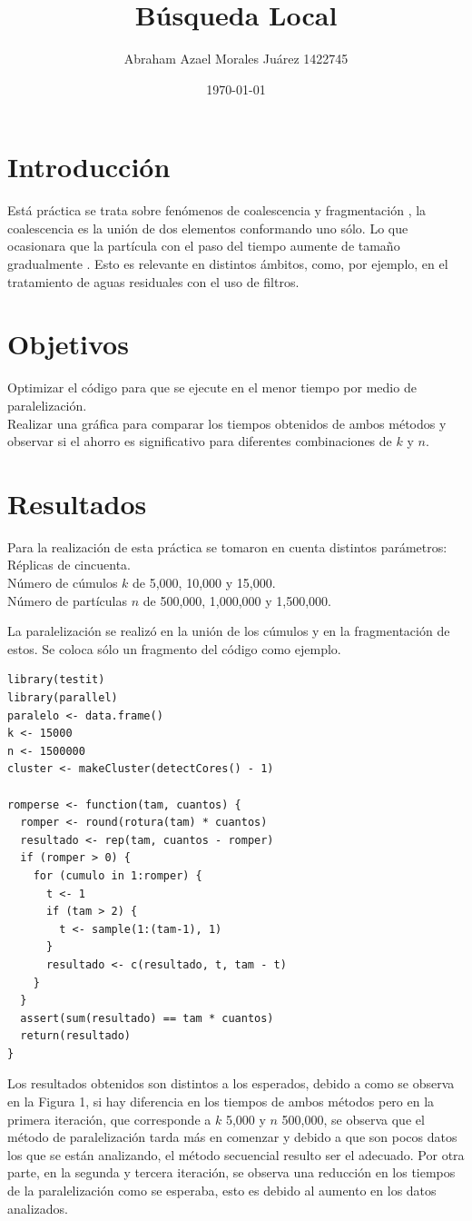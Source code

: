 \documentclass{article}
\author{Abraham Azael Morales Juárez  1422745}
\title{Búsqueda Local}
\date{\today}
\begin{document}
\maketitle

\section{Introducción}
Está práctica se trata sobre fenómenos de coalescencia y fragmentación \cite{REF1}, la coalescencia es la unión de dos elementos conformando uno sólo. Lo que ocasionara que la partícula con el paso del tiempo aumente de tamaño gradualmente \cite{REF2}. Esto es relevante en distintos ámbitos, como, por ejemplo, en el tratamiento de aguas residuales con el uso de filtros.

\section{Objetivos}
Optimizar el código para que se ejecute en el menor tiempo por medio de paralelización.\\
Realizar una gráfica para comparar los tiempos obtenidos de ambos métodos y observar si el ahorro es  significativo para diferentes combinaciones de $k$ y $n$.

\section{Resultados}
Para la realización de esta práctica se tomaron en cuenta distintos parámetros:\\ 
Réplicas de cincuenta.\\
Número de cúmulos $k$ de 5,000, 10,000 y 15,000.\\
Número de partículas $n$ de 500,000, 1,000,000 y 1,500,000.

La paralelización se realizó en la unión de los cúmulos y en la fragmentación de estos. Se coloca sólo un fragmento del código como ejemplo.

\begin{lstlisting}[frame=single]
library(testit) 
library(parallel)
paralelo <- data.frame()
k <- 15000
n <- 1500000
cluster <- makeCluster(detectCores() - 1)

romperse <- function(tam, cuantos) {
  romper <- round(rotura(tam) * cuantos) 
  resultado <- rep(tam, cuantos - romper) 
  if (romper > 0) {
    for (cumulo in 1:romper) { 
      t <- 1
      if (tam > 2) { 
        t <- sample(1:(tam-1), 1)
      }
      resultado <- c(resultado, t, tam - t)
    }
  }
  assert(sum(resultado) == tam * cuantos) 
  return(resultado)
}
\end{lstlisting}
\vspace{40mm}
Los resultados obtenidos son distintos a los esperados, debido a como se observa en la Figura 1, si hay diferencia en los tiempos de ambos métodos pero en la primera iteración, que corresponde a $k$ 5,000 y $n$ 500,000, se observa que el método de paralelización tarda más en comenzar y debido a que son pocos datos los que se están analizando, el método secuencial resulto ser el adecuado.  Por otra parte, en la segunda y tercera iteración, se observa una reducción en los tiempos de la paralelización como se esperaba, esto es debido al aumento en los datos analizados. 
\end{document}
